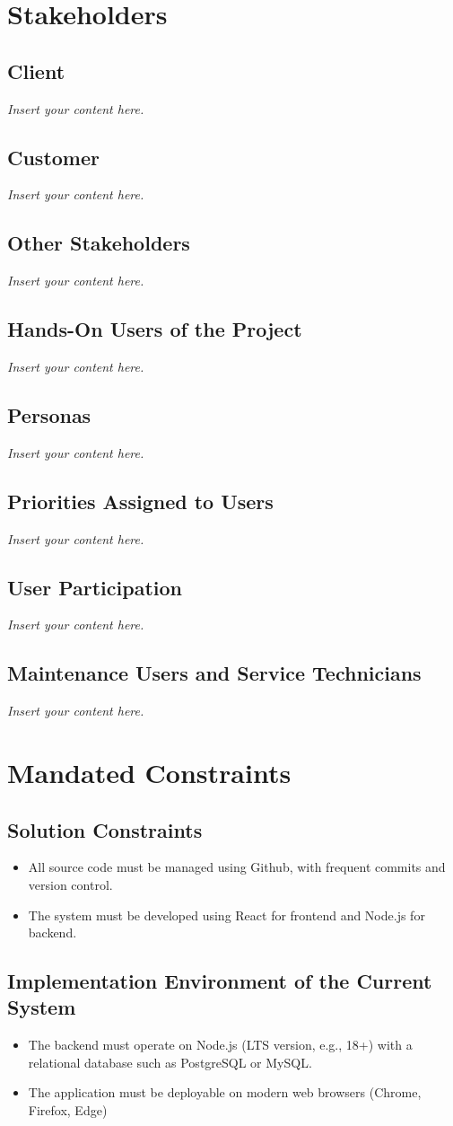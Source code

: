 \documentclass[12pt]{article}
\newcommand{\lips}{\textit{Insert your content here.}}
\begin{document}
\section{Stakeholders}
\subsection{Client}
\lips
\subsection{Customer}
\lips
\subsection{Other Stakeholders}
\lips
\subsection{Hands-On Users of the Project}
\lips
\subsection{Personas}
\lips
\subsection{Priorities Assigned to Users}
\lips
\subsection{User Participation}
\lips
\subsection{Maintenance Users and Service Technicians}
\lips

\section{Mandated Constraints}
\subsection{Solution Constraints}
	\begin{itemize}
		\item All source code must be managed using Github, with frequent commits and version control.
		\item The system must be developed using React for frontend and Node.js for backend.
	\end{itemize}
\subsection{Implementation Environment of the Current System}
\begin{itemize}
		\item The backend must operate on Node.js (LTS version, e.g., 18+) with a relational database such as PostgreSQL or MySQL.
		\item The application must be deployable on modern web browsers (Chrome, Firefox, Edge)
	\end{itemize}
\end{document}
